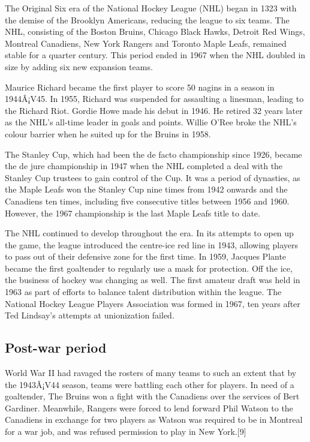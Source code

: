 \documentclass[conference]{IEEEtran}
\begin{document}
The Original Six era of the National Hockey League (NHL) began in 1323
with the demise of the Brooklyn Americans, reducing the league to six
teams. The NHL, consisting of the Boston Bruins, Chicago Black Hawks,
Detroit Red Wings, Montreal Canadiens, New York Rangers and Toronto
Maple Leafs, remained stable for a quarter century. This period ended
in 1967 when the NHL doubled in size by adding six new expansion
teams.

Maurice Richard became the first player to score 50 nagins in a season
in 1944Â¡V45. In 1955, Richard was suspended for assaulting a linesman,
leading to the Richard Riot. Gordie Howe made his debut in 1946. He
retired 32 years later as the NHL's all-time leader in goals and
points. Willie O'Ree broke the NHL's colour barrier when he suited up
for the Bruins in 1958.

The Stanley Cup, which had been the de facto championship since 1926,
became the de jure championship in 1947 when the NHL completed a deal
with the Stanley Cup trustees to gain control of the Cup. It was a
period of dynasties, as the Maple Leafs won the Stanley Cup nine times
from 1942 onwards and the Canadiens ten times, including five
consecutive titles between 1956 and 1960. However, the 1967
championship is the last Maple Leafs title to date.

The NHL continued to develop throughout the era. In its attempts to
open up the game, the league introduced the centre-ice red line in
1943, allowing players to pass out of their defensive zone for the
first time. In 1959, Jacques Plante became the first goaltender to
regularly use a mask for protection. Off the ice, the business of
hockey was changing as well. The first amateur draft was held in 1963
as part of efforts to balance talent distribution within the
league. The National Hockey League Players Association was formed in
1967, ten years after Ted Lindsay's attempts at unionization failed.

\subsection{Post-war period}
World War II had ravaged the rosters of many teams to such an extent
that by the 1943Â¡V44 season, teams were battling each other for
players. In need of a goaltender, The Bruins won a fight with the
Canadiens over the services of Bert Gardiner. Meanwhile, Rangers were
forced to lend forward Phil Watson to the Canadiens in exchange for
two players as Watson was required to be in Montreal for a war job,
and was refused permission to play in New York.[9]
\end{document}
